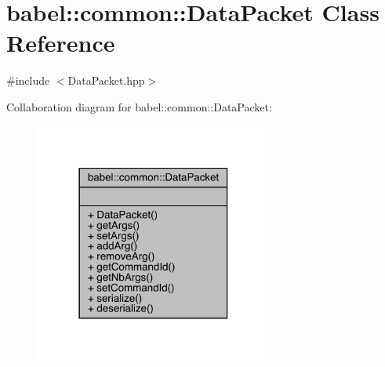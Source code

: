 \hypertarget{classbabel_1_1common_1_1_data_packet}{}\section{babel\+:\+:common\+:\+:Data\+Packet Class Reference}
\label{classbabel_1_1common_1_1_data_packet}


{\ttfamily \#include $<$Data\+Packet.\+hpp$>$}



Collaboration diagram for babel\+:\+:common\+:\+:Data\+Packet\+:\nopagebreak
\begin{figure}[H]
\begin{center}
\leavevmode
\includegraphics[width=222pt]{classbabel_1_1common_1_1_data_packet__coll__graph}
\end{center}
\end{figure}

